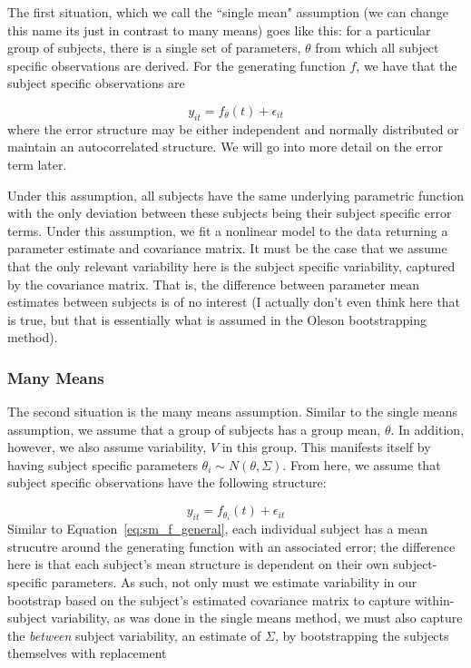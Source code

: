 \documentclass{article}
\begin{document}
The first situation, which we call the ``single mean" assumption (we can change this name its just in contrast to many means) goes like this: for a particular group of subjects, there is a single set of parameters, $\theta$ from which all  subject specific observations are derived. For the generating function $f$, we have that the subject specific observations are

\begin{equation}\label{eq:sm_f_general}
y_{it} = f_{\theta}(t) + \epsilon_{it}
\end{equation}
where the error structure may be either independent and normally distributed or maintain an autocorrelated structure. We will go into more detail on the error term later.

Under this assumption, all subjects have the same underlying parametric function with the only deviation between these subjects being their subject specific error terms. Under this assumption, we fit a nonlinear model to the data returning a parameter estimate and covariance matrix. It must be the case that we assume that the only relevant variability here is the subject specific variability, captured by the covariance matrix. That is, the difference between parameter mean estimates between subjects is of no interest (I actually don't even think here that is true, but that is essentially what is assumed in the Oleson bootstrapping method).

\subsubsection{Many Means}

The second situation is the many means assumption. Similar to the single means assumption, we assume that a group of subjects has a group mean, $\theta$. In addition, however, we also assume variability, $V$ in this group. This manifests itself by having subject specific parameters $\theta_i \sim N(\theta, \Sigma)$. From here, we assume that subject specific observations have the following structure:

\begin{equation} \label{eq:mm_f_general}
y_{it} = f_{\theta_i}(t) + \epsilon_{it}
\end{equation}
Similar to Equation~\ref{eq:sm_f_general}, each individual subject has a mean strucutre around the generating function with an associated error; the difference here is that each subject's mean structure is dependent on their own subject-specific parameters. As such, not only must we estimate variability in our bootstrap based on the subject's estimated covariance matrix to capture within-subject variability, as was done in the single means method, we must also capture the \textit{between} subject variability, an estimate of $\Sigma$, by bootstrapping the subjects themselves with replacement
\end{document}
